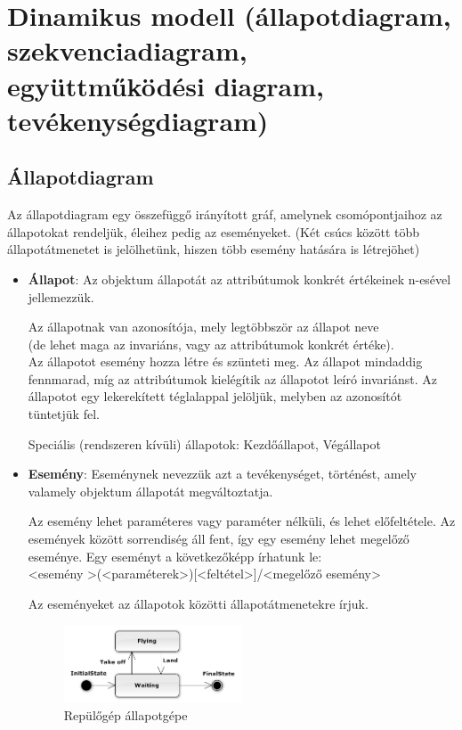 \documentclass[12pt,margin=0px]{article}
\begin{document}
    \section*{Dinamikus modell (állapotdiagram, szekvenciadiagram,\\ együttműködési diagram, tevékenységdiagram)}
		
    \subsection*{Állapotdiagram}

    Az állapotdiagram egy összefüggő irányított gráf, amelynek csomópontjaihoz az állapotokat rendeljük, éleihez pedig az eseményeket. (Két csúcs között több állapotátmenetet is jelölhetünk, hiszen több esemény hatására is létrejöhet)
	\begin{itemize}
		\item \textbf{Állapot}:
			Az objektum állapotát az attribútumok konkrét értékeinek n-esével jellemezzük.
					
            Az állapotnak van azonosítója, mely legtöbbször az állapot neve\\
            (de lehet maga az invariáns, vagy az attribútumok konkrét értéke). \\
            Az állapotot esemény hozza létre és szünteti meg. Az állapot mindaddig fennmarad, míg az attribútumok kielégítik az állapotot leíró invariánst. Az állapotot egy lekerekített téglalappal jelöljük, melyben az azonosítót tüntetjük fel.
					
			Speciális (rendszeren kívüli) állapotok: Kezdőállapot, Végállapot
		\item \textbf{Esemény}:
			Eseménynek nevezzük azt a tevékenységet, történést, amely valamely objektum állapotát megváltoztatja.
					
            Az esemény lehet paraméteres vagy paraméter nélküli, és lehet előfeltétele. Az események között sorrendiség áll fent, így egy esemény lehet megelőző eseménye. Egy eseményt a következőképp írhatunk le:\\
            \textless esemény \textgreater (\textless paraméterek\textgreater)[\textless feltétel\textgreater]/\textless megelőző esemény\textgreater
					
			Az eseményeket az állapotok közötti állapotátmenetekre írjuk.
			\begin{figure}[H]
				\centering
				\includegraphics[width=0.5\textwidth]{img/plane.png}
				\caption{Repülőgép állapotgépe}
			\end{figure}
		\end{itemize}
\end{document}
